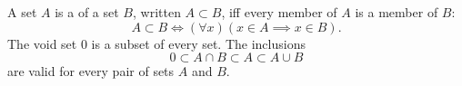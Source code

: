 A set $A$ is a  of a set $B$, written $A \subset B$, iff every member of $A$ is a member of $B$:
$$
A \subset B \iff (\forall x)(x \in A \implies x \in B).
$$
The void set $0$ is a subset of every set. The inclusions
$$
0 \subset A \cap B \subset A \subset A \cup B
$$
are valid for every pair of sets $A$ and $B$.
